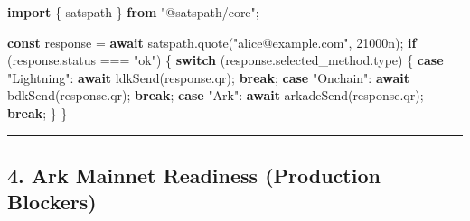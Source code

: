 \documentclass[
]{article}
\newenvironment{Shaded}{}{}
\newcommand{\AttributeTok}[1]{\textcolor[rgb]{0.49,0.56,0.16}{#1}}
\newcommand{\ControlFlowTok}[1]{\textcolor[rgb]{0.00,0.44,0.13}{\textbf{#1}}}
\newcommand{\DecValTok}[1]{\textcolor[rgb]{0.25,0.63,0.44}{#1}}
\newcommand{\FunctionTok}[1]{\textcolor[rgb]{0.02,0.16,0.49}{#1}}
\newcommand{\ImportTok}[1]{\textcolor[rgb]{0.00,0.50,0.00}{\textbf{#1}}}
\newcommand{\KeywordTok}[1]{\textcolor[rgb]{0.00,0.44,0.13}{\textbf{#1}}}
\newcommand{\NormalTok}[1]{#1}
\newcommand{\OperatorTok}[1]{\textcolor[rgb]{0.40,0.40,0.40}{#1}}
\newcommand{\StringTok}[1]{\textcolor[rgb]{0.25,0.44,0.63}{#1}}
\begin{document}
\begin{Shaded}
\begin{Highlighting}[]
\ImportTok{import}\NormalTok{ \{ satspath \} }\ImportTok{from} \StringTok{"@satspath/core"}\OperatorTok{;}

\KeywordTok{const}\NormalTok{ response }\OperatorTok{=} \ControlFlowTok{await}\NormalTok{ satspath}\OperatorTok{.}\FunctionTok{quote}\NormalTok{(}\StringTok{"alice@example.com"}\OperatorTok{,} \DecValTok{21000}\NormalTok{n)}\OperatorTok{;}
\ControlFlowTok{if}\NormalTok{ (response}\OperatorTok{.}\AttributeTok{status} \OperatorTok{===} \StringTok{"ok"}\NormalTok{) \{}
  \ControlFlowTok{switch}\NormalTok{ (response}\OperatorTok{.}\AttributeTok{selected\_method}\OperatorTok{.}\AttributeTok{type}\NormalTok{) \{}
    \ControlFlowTok{case} \StringTok{"Lightning"}\OperatorTok{:}
      \ControlFlowTok{await} \FunctionTok{ldkSend}\NormalTok{(response}\OperatorTok{.}\AttributeTok{qr}\NormalTok{)}\OperatorTok{;}
      \ControlFlowTok{break}\OperatorTok{;}
    \ControlFlowTok{case} \StringTok{"Onchain"}\OperatorTok{:}
      \ControlFlowTok{await} \FunctionTok{bdkSend}\NormalTok{(response}\OperatorTok{.}\AttributeTok{qr}\NormalTok{)}\OperatorTok{;}
      \ControlFlowTok{break}\OperatorTok{;}
    \ControlFlowTok{case} \StringTok{"Ark"}\OperatorTok{:}
      \ControlFlowTok{await} \FunctionTok{arkadeSend}\NormalTok{(response}\OperatorTok{.}\AttributeTok{qr}\NormalTok{)}\OperatorTok{;}
      \ControlFlowTok{break}\OperatorTok{;}
\NormalTok{  \}}
\NormalTok{\}}
\end{Highlighting}
\end{Shaded}

\begin{center}\rule{0.5\linewidth}{0.5pt}\end{center}

\hypertarget{ark-mainnet-readiness-production-blockers}{%
\subsection{4. Ark Mainnet Readiness (Production
Blockers)}\label{ark-mainnet-readiness-production-blockers}}
\end{document}
